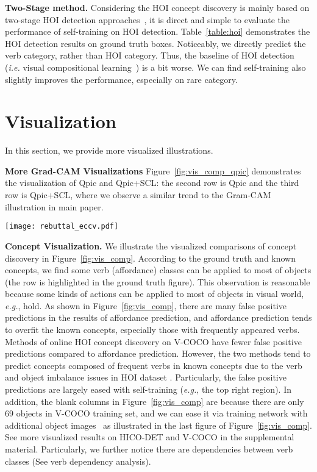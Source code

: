 \documentclass[runningheads]{llncs}
\newcommand{\ie}{\textit{i.e. }}
\newcommand{\eg}{\textit{e.g.}}
\begin{document}
{\bf Two-Stage method.} Considering the HOI concept discovery is mainly based on two-stage HOI detection approaches~\cite{hou2020visual}, it is direct and simple to evaluate the performance of self-training on HOI detection. Table~\ref{table:hoi} demonstrates the HOI detection results on ground truth boxes. Noticeably, we directly predict the verb category, rather than HOI category. Thus, the baseline of HOI detection (\ie visual compositional learning~\cite{hou2020visual}) is a bit worse. We can find self-training also slightly improves the performance, especially on rare category.


\section{Visualization}
\label{sec:visualize}

In this section, we provide more visualized illustrations.

{\bf More Grad-CAM Visualizations} 
Figure~\ref{fig:vis_comp_qpic} demonstrates the visualization of Qpic and Qpic+SCL: the second row is Qpic and the third row is Qpic+SCL, where we observe a similar trend to the Gram-CAM illustration in main paper.

\begin{figure*}
\centering
    \texttt{[image: rebuttal\_eccv.pdf]}
    \caption{Visualized Illustration of SCL+Qpic and Qpic~\cite{tamura_cvpr2021}.}
    \label{fig:vis_comp_qpic}
\end{figure*}



{\bf Concept Visualization.} We illustrate the visualized comparisons of concept discovery in Figure~\ref{fig:vis_comp}. According to the ground truth and known concepts, we find some verb (affordance) classes can be applied to most of objects (the row is highlighted in the ground truth figure). This observation is reasonable because some kinds of actions can be applied to most of objects in visual world, \eg, hold. As shown in Figure~\ref{fig:vis_comp}, there are many false positive predictions in the results of affordance prediction, and affordance prediction tends to overfit the known concepts, especially those with frequently appeared verbs. Methods of online HOI concept discovery on V-COCO have fewer false positive predictions compared to affordance prediction. However, the two methods tend to predict concepts composed of frequent verbs in known concepts due to the verb and object imbalance issues in HOI dataset \cite{hou2021fcl}. Particularly, the false positive predictions are largely eased with self-training (\eg, the top right region). In addition, the blank columns in Figure~\ref{fig:vis_comp} are because there are only 69 objects in V-COCO training set, and we can ease it via training network with additional object images~\cite{hou2021atl} as illustrated in the last figure of Figure~\ref{fig:vis_comp}. See more visualized results on HICO-DET and V-COCO in the supplemental material. Particularly, we further notice there are dependencies between verb classes (See verb dependency analysis).
\end{document}

